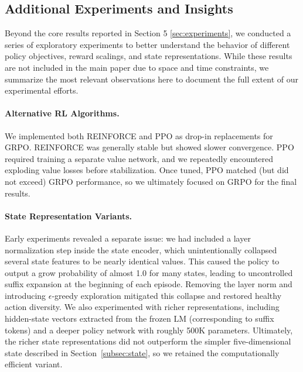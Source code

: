 \documentclass[11pt]{article}
\begin{document}

\label{sec:conclusion}



\subsection{Additional Experiments and Insights}

Beyond the core results reported in Section 5 \ref{sec:experiments}, we conducted a series of exploratory experiments to better understand the behavior of different policy objectives, reward scalings, and state representations. While these results are not included in the main paper due to space and time constraints, we summarize the most relevant observations here to document the full extent of our experimental efforts.

\paragraph{Alternative RL Algorithms.}
We implemented both REINFORCE \citep{williams1992reinforce} and PPO \citep{schulman2017ppo} as drop-in replacements for GRPO. REINFORCE was generally stable but showed slower convergence. PPO required training a separate value network, and we repeatedly encountered exploding value losses before stabilization. Once tuned, PPO matched (but did not exceed) GRPO performance, so we ultimately focused on GRPO for the final results.

\paragraph{State Representation Variants.}
Early experiments revealed a separate issue: we had included a layer normalization step inside the state encoder, which unintentionally collapsed several state features to be nearly identical values. This caused the policy to output a grow probability of almost 1.0 for many states, leading to uncontrolled suffix expansion at the beginning of each episode. Removing the layer norm and introducing $\epsilon$-greedy exploration mitigated this collapse and restored healthy action diversity. We also experimented with richer representations, including hidden-state vectors extracted from the frozen LM (corresponding to suffix tokens) and a deeper policy network with roughly 500K parameters. Ultimately, the richer state representations did not outperform the simpler five-dimensional state described in Section~\ref{subsec:state}, so we retained the computationally efficient variant.
\end{document}
